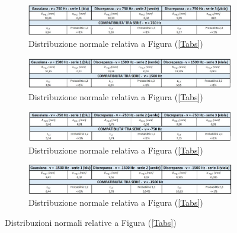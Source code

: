 \documentclass{article}
\begin{document}
\begin{figure}[h]
    \centering
    \begin{subfigure}{\linewidth}
        \centering
        \includegraphics[width=\linewidth]{Coerenza_Gauss1.JPG}
        \caption{Distribuzione normale relativa a Figura (\ref{Tabs})}
        \label{Gauss_750}
    \end{subfigure}
    \newline
    \begin{subfigure}{\linewidth}
        \centering
        \includegraphics[width=\linewidth]{Coerenza_Gauss2.JPG}
        \caption{Distribuzione normale relativa a Figura (\ref{Tabs})}
        \label{Gauss_1500}  
    \end{subfigure}
    \newline
    \begin{subfigure}{\linewidth}
        \centering
        \includegraphics[width=\linewidth]{Coerenza_Gauss3.JPG}
        \caption{Distribuzione normale relativa a Figura (\ref{Tabs})}
        \label{Gauss_-750}     
    \end{subfigure}
    \newline
    \begin{subfigure}{\linewidth}
        \centering
        \includegraphics[width=\linewidth]{Coerenza_Gauss4.JPG}
        \caption{Distribuzione normale relativa a Figura (\ref{Tabs})}
        \label{Gauss_-1500}   
    \end{subfigure}
    \caption{Distribuzioni normali relative a Figura (\ref{Tabs})}
    \label{Gauss}
\end{figure}
\end{document}
